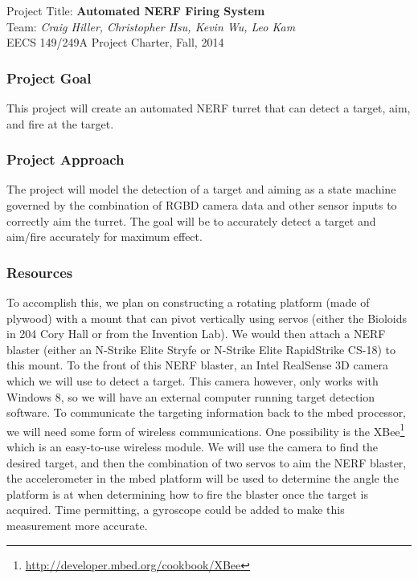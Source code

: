 \documentclass[11pt]{article}
\begin{document}
\begin{center}
Project Title: \textbf{Automated NERF Firing System}\\
Team: \textit{Craig Hiller, Christopher Hsu, Kevin Wu, Leo Kam}\\
EECS 149/249A Project Charter, Fall, 2014
\end{center}
\subsubsection*{Project Goal} This project will create an automated NERF turret that can detect a target, aim, and fire at the target.
\subsubsection*{Project Approach} The project will model the detection of a target and aiming as a state machine governed by the combination of RGBD camera data and other sensor inputs to correctly aim the turret. The goal will be to accurately detect a target and aim/fire accurately for maximum effect.  
\subsubsection*{Resources} To accomplish this, we plan on constructing a rotating platform (made of plywood) with a mount that can pivot vertically using servos (either the Bioloids in 204 Cory Hall or from the Invention Lab). We would then attach a NERF blaster (either an N-Strike Elite Stryfe or N-Strike Elite RapidStrike CS-18) to this mount. To the front of this NERF blaster, an Intel RealSense 3D camera which we will use to detect a target. This camera however, only works with Windows 8, so we will have an external computer running target detection software. To communicate the targeting information back to the mbed processor, we will need some form of wireless communications. One possibility is the XBee\footnote{\url{http://developer.mbed.org/cookbook/XBee}} which is an easy-to-use wireless module. We will use the camera to find the desired target, and then the combination of two servos to aim the NERF blaster, the accelerometer in the mbed platform will be used to determine the angle the platform is at when determining how to fire the blaster once the target is acquired. Time permitting, a gyroscope could be added to make this measurement more accurate. 
\end{document}
